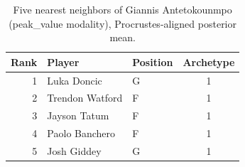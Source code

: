 \begin{table}[htbp]
  \centering\small
  \begin{tabular}{rllc}
    \toprule
    Rank & Player & Position & Archetype \\
    \midrule
    1 & Luka Doncic & G & 1 \\
    2 & Trendon Watford & F & 1 \\
    3 & Jayson Tatum & F & 1 \\
    4 & Paolo Banchero & F & 1 \\
    5 & Josh Giddey & G & 1 \\
    \bottomrule
  \end{tabular}
  \caption{Five nearest neighbors of Giannis Antetokounmpo (peak_value modality), Procrustes-aligned posterior mean.}
  \label{tab:Giannis_Antetokounmpo_neighbors_peak_value}
\end{table}

